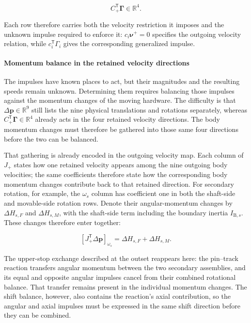 \documentclass[11pt]{report}
\numberwithin{equation}{section}
\begin{document}
\begin{equation}
    C_+^{\mathsf T}\boldsymbol\Gamma
    \in\mathbb R^4.
    \label{eq:finite_event_generalized_constraint_impulse}
\end{equation}

Each row therefore carries both the velocity restriction it imposes and the
unknown impulse required to enforce it:
\(c_i\boldsymbol\nu^+=0\) specifies the outgoing velocity relation, while
\(c_i^{\mathsf T}\Gamma_i\) gives the corresponding generalized impulse.

\paragraph{Momentum balance in the retained velocity directions}

The impulses have known places to act, but their magnitudes and the
resulting speeds remain unknown.  Determining them requires balancing
those impulses against the momentum changes of the moving hardware.
The difficulty is that \(\Delta\boldsymbol p\in\mathbb R^9\) still
lists the nine physical translations and rotations separately, whereas
\(C_+^{\mathsf T}\boldsymbol\Gamma\in\mathbb R^4\) already acts in the
four retained velocity directions.  The body momentum changes must
therefore be gathered into those same four directions before the two
can be balanced.

That gathering is already encoded in the outgoing velocity map. Each
column of \(J_+\) states how one retained velocity appears among the
nine outgoing body velocities; the same coefficients therefore state
how the corresponding body momentum changes contribute back to that
retained direction. For secondary rotation, for example, the
\(\omega_s\) column has coefficient one in both the shaft-side and
movable-side rotation rows. Denote their angular-momentum changes by
\(\Delta H_{s,F}\) and \(\Delta H_{s,M}\), with the shaft-side term
including the boundary inertia \(I_{\mathrm B,s}\). These changes
therefore enter together:

\begin{equation}
    \left[J_+^{\mathsf T}\Delta\boldsymbol p\right]_{\omega_s}
    =
    \Delta H_{s,F}+\Delta H_{s,M}.
    \label{eq:finite_event_secondary_momentum_gathering}
\end{equation}

The upper-stop exchange described at the outset reappears here: the
pin--track reaction transfers angular momentum between the two secondary
assemblies, and its equal and opposite angular impulses cancel from their
combined rotational balance. That transfer remains present in the
individual momentum changes. The shift balance, however, also contains
the reaction's axial contribution, so the angular and axial impulses
must be expressed in the same shift direction before they can be combined.
\end{document}
